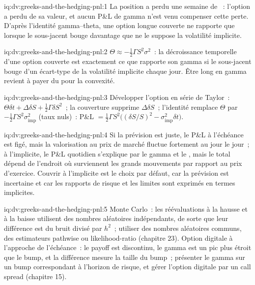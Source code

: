\begin{solution}{iq:dv:greeks-and-the-hedging-pnl:1}
La position a perdu une semaine de ~: l'option a perdu de sa valeur, et aucun P\&L de gamma n'est venu compenser cette perte.
D'après l'identité gamma--theta, une option longue couverte ne rapporte que lorsque le sous-jacent
bouge davantage que ne le suppose la volatilité implicite.
\end{solution}

\begin{solution}{iq:dv:greeks-and-the-hedging-pnl:2}
$\Theta\approx-\tfrac12\Gamma S^2\sigma^2$~: la décroissance temporelle d'une option couverte est
exactement ce que rapporte son gamma si le sous-jacent bouge d'un écart-type de la
volatilité implicite chaque jour. Être long en gamma revient à payer du  pour la convexité.
\end{solution}

\begin{solution}{iq:dv:greeks-and-the-hedging-pnl:3}
Développer l'option en série de Taylor~: $\Theta\delta t+\Delta\delta S+\tfrac12\Gamma\delta S^2$~; la
couverture supprime $\Delta\delta S$~; l'identité remplace $\Theta$ par $-\tfrac12\Gamma S^2
\sigma_{\mathrm{imp}}^2$ (taux nuls)~: P\&L $=\tfrac12\Gamma S^2\bigl((\delta S/S)^2-
\sigma_{\mathrm{imp}}^2\delta t\bigr)$.
\end{solution}

\begin{solution}{iq:dv:greeks-and-the-hedging-pnl:4}
Si la prévision est juste, le P\&L à l'échéance est figé, mais la valorisation au prix de
marché fluctue fortement au jour le jour~; à l'implicite, le P\&L quotidien s'explique par le gamma
et le , mais le total dépend de l'endroit où surviennent les grands mouvements par rapport
au prix d'exercice. Couvrir à l'implicite est le choix par défaut, car la prévision est incertaine
et car les rapports de risque et les limites sont exprimés en termes implicites.
\end{solution}

\begin{solution}{iq:dv:greeks-and-the-hedging-pnl:5}
Monte Carlo~: les réévaluations à la hausse et à la baisse utilisent des nombres aléatoires indépendants, de sorte que leur
différence est du bruit divisé par $h^2$~; utiliser des nombres aléatoires communs, des estimateurs pathwise ou
likelihood-ratio (chapitre 23). Option digitale à l'approche de l'échéance~: le payoff est
discontinu, le gamma est un pic plus étroit que le bump, et la différence mesure
la taille du bump~; présenter le gamma sur un bump correspondant à l'horizon de risque, et gérer
l'option digitale par un call spread (chapitre 15).
\end{solution}

